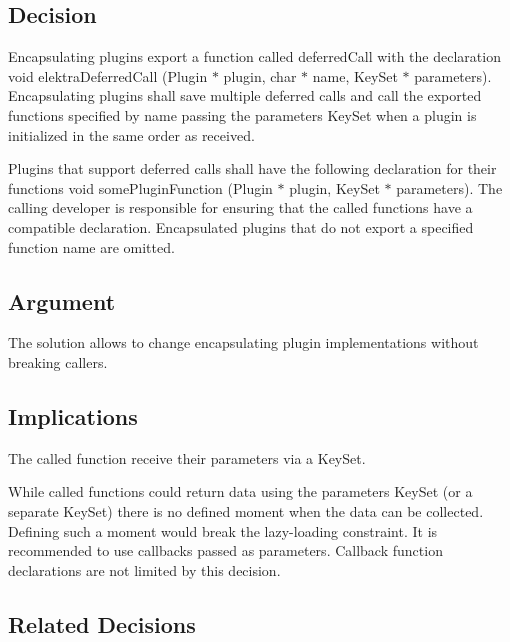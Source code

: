 \subsection*{Decision}

Encapsulating plugins export a function called {\ttfamily deferred\+Call} with the declaration {\ttfamily void elektra\+Deferred\+Call (Plugin $\ast$ plugin, char $\ast$ name, Key\+Set $\ast$ parameters)}. Encapsulating plugins shall save multiple deferred calls and call the exported functions specified by {\ttfamily name} passing the {\ttfamily parameters} Key\+Set when a plugin is initialized in the same order as received.

Plugins that support deferred calls shall have the following declaration for their functions {\ttfamily void some\+Plugin\+Function (Plugin $\ast$ plugin, Key\+Set $\ast$ parameters)}. The calling developer is responsible for ensuring that the called functions have a compatible declaration. Encapsulated plugins that do not export a specified function name are omitted.

\subsection*{Argument}

The solution allows to change encapsulating plugin implementations without breaking callers.

\subsection*{Implications}

The called function receive their parameters via a Key\+Set.

While called functions could return data using the {\ttfamily parameters} Key\+Set (or a separate Key\+Set) there is no defined moment when the data can be collected. Defining such a moment would break the lazy-\/loading constraint. It is recommended to use callbacks passed as {\ttfamily parameters}. Callback function declarations are not limited by this decision.

\subsection*{Related Decisions}


